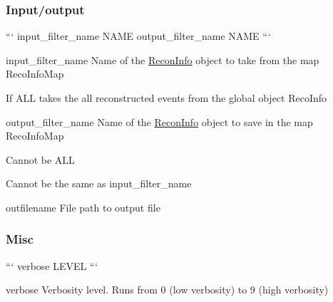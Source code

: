 \subsubsection*{Input/output}

``` input\-\_\-filter\-\_\-name N\-A\-M\-E output\-\_\-filter\-\_\-name N\-A\-M\-E ```


\begin{DoxyItemize}
\item {\ttfamily input\-\_\-filter\-\_\-name} Name of the {\ttfamily \hyperlink{classReconInfo}{Recon\-Info}} object to take from the map {\ttfamily Reco\-Info\-Map}
\begin{DoxyItemize}
\item If A\-L\-L takes the all reconstructed events from the global object {\ttfamily Reco\-Info}
\end{DoxyItemize}
\item {\ttfamily output\-\_\-filter\-\_\-name} Name of the {\ttfamily \hyperlink{classReconInfo}{Recon\-Info}} object to save in the map {\ttfamily Reco\-Info\-Map}
\begin{DoxyItemize}
\item Cannot be A\-L\-L
\item Cannot be the same as {\ttfamily input\-\_\-filter\-\_\-name}
\end{DoxyItemize}
\item {\ttfamily outfilename} File path to output file
\end{DoxyItemize}

\subsubsection*{Misc}

``` verbose L\-E\-V\-E\-L ```


\begin{DoxyItemize}
\item {\ttfamily verbose} Verbosity level. Runs from 0 (low verbosity) to 9 (high verbosity) 
\end{DoxyItemize}